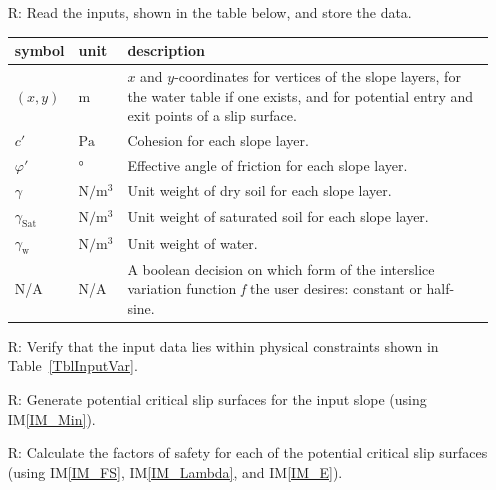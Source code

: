 \documentclass[12pt]{article}
\renewcommand{\arraystretch}{1}
\newcommand{\iref}[1]{IM\ref{#1}}
\newcounter{reqnum} %
\newcounter{tablenum} %
\begin{document}
\noindent \begin{itemize}

\item[R\refstepcounter{reqnum}\thereqnum \label{R_Inputs}:] Read the
  inputs, shown in the table below, and store the data.
  
  \renewcommand{\arraystretch}{1.5}
  \noindent \begin{longtable}{l l p{12cm}} \toprule \textbf{symbol} &
    {tablenum}  \label{Table:Inputs}
    \textbf{unit} & \textbf{description}\\ \midrule
    $\left(x,y\right)$ & $\text{m}$ & $x$ and $y$-coordinates for vertices
    of the slope layers, for the water table if one exists, and for potential 
    entry and exit points of a slip surface.\\
    $c'$ & $\si{\pascal}$ & Cohesion for each slope layer. \\
    $\varphi'$ & \si{\degree} & Effective angle of friction for each
    slope layer. \\
    $\gamma$ & $\si{\newton\per\meter\cubed}$ & Unit weight of dry
    soil for each slope layer. \\
    $\gamma_{\text{Sat}}$ & $\si{\newton\per\meter\cubed}$ & Unit
    weight of saturated soil for each slope layer. \\
    $\gamma_{\text{w}}$ & $\si{\newton\per\meter\cubed}$ & Unit
    weight of water. \\
    N/A & N/A & A boolean decision on which form of the interslice variation 
    function \textit{f} the user desires: constant or half-sine.\\ \bottomrule
\end{longtable}

\item[R\refstepcounter{reqnum}\thereqnum \label{R_KinAdm}:] Verify that the 
input data lies within physical constraints shown in Table~\ref{TblInputVar}.

\item[R\refstepcounter{reqnum}\thereqnum \label{R_InitGen}:] Generate
potential critical slip surfaces for the input slope (using \iref{IM_Min}). 

\item[R\refstepcounter{reqnum}\thereqnum \label{R_FS}:] Calculate the
  factors of safety for each of the potential critical slip surfaces (using 
  \iref{IM_FS}, \iref{IM_Lambda}, and \iref{IM_E}).


\end{itemize}
\end{document}
